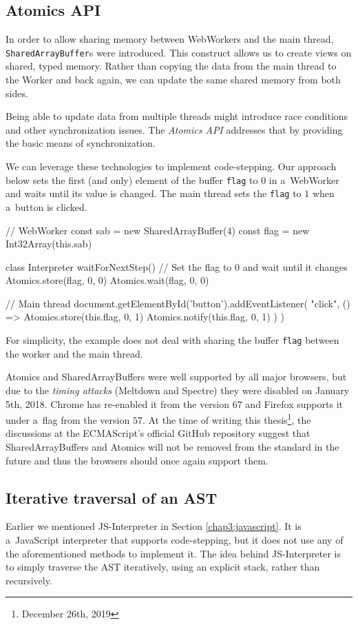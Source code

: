 \subsection*{Atomics API}
\label{chap4:atomics}
In order to allow sharing memory between WebWorkers and the main thread, \texttt{SharedArrayBuffer}s were introduced. This construct allows us to create
views on shared, typed memory. Rather than copying the data from the main thread to the Worker and back again, we can update the same shared memory from both sides.

Being able to update data from multiple threads might introduce race conditions and other synchronization issues. The \emph{Atomics API} addresses that by providing
the basic means of synchronization.

We can leverage these technologies to implement code-stepping. Our approach below sets the first (and only) element of the buffer \texttt{flag} to $0$ in a~WebWorker
and waits until its value is changed. The main thread sets the \texttt{flag} to $1$ when a~button is clicked.
\begin{code}
// WebWorker
const sab = new SharedArrayBuffer(4)
const flag = new Int32Array(this.sab)

class Interpreter {
    waitForNextStep() {
        // Set the flag to 0 and wait until it changes
        Atomics.store(flag, 0, 0)
        Atomics.wait(flag, 0, 0)
    }
}

// Main thread
document.getElementById('button').addEventListener(
    "click",
    () => {
        Atomics.store(this.flag, 0, 1)
        Atomics.notify(this.flag, 0, 1)
    })
)
\end{code}
For simplicity, the example does not deal with sharing the buffer \texttt{flag} between the worker and the main thread.

Atomics and SharedArrayBuffers were well supported by all major browsers, but due to the \emph{timing attacks} (Meltdown and Spectre) they were disabled on
January 5th, 2018. Chrome has re-enabled it from the version $67$ and Firefox supports it under a~flag from the version $57$. At the time of
writing this thesis\footnote{December 26th, 2019}, the discussions at the ECMAScript's official GitHub repository suggest that SharedArrayBuffers and Atomics
will not be removed from the standard in the future and thus the browsers should once again support them.

\subsection*{Iterative traversal of an AST}
Earlier we mentioned JS-Interpreter \cite{JSInterpreter} in Section \ref{chap3:javascript}. It is a~JavaScript interpreter that supports code-stepping, but
it does not use any of the aforementioned methods to implement it. The idea behind JS-Interpreter is to simply traverse the AST iteratively, using an explicit
stack, rather than recursively.

